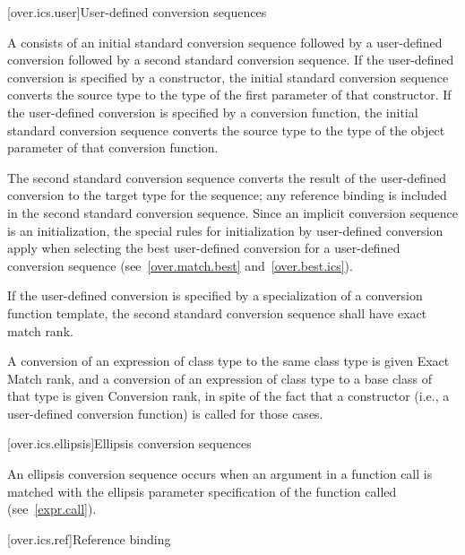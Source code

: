 [over.ics.user]{User-defined conversion sequences}

\pnum
A  consists of an initial
standard conversion sequence followed by a user-defined
conversion followed by a second standard
conversion sequence.
If the user-defined conversion is specified
by a constructor, the initial standard
conversion sequence converts the source type to the type of the
first parameter of that constructor.
If the user-defined
conversion is specified by a conversion function, the
initial standard conversion sequence
converts the source type to the type of the
object parameter of that conversion function.

\pnum
The second standard conversion sequence converts the result of
the user-defined conversion to the target type for the sequence;
any reference binding is included in the second standard
conversion sequence.
Since an implicit conversion sequence is an initialization, the
special rules for initialization by user-defined conversion apply
when selecting the best user-defined conversion for a
user-defined conversion sequence (see~\ref{over.match.best} and~\ref{over.best.ics}).

\pnum
If the user-defined conversion is specified by a
specialization of a conversion function template,
the second standard conversion sequence shall have exact match rank.

\pnum
A conversion of an expression of class type
to the same class type is given Exact Match rank, and
a conversion of an expression of class type
to a base class of that type is given Conversion rank,
in spite of the
fact that a constructor (i.e., a user-defined conversion
function) is called for those cases.

[over.ics.ellipsis]{Ellipsis conversion sequences}

\pnum
{}%
An ellipsis conversion sequence occurs when an argument in a
function call is matched with the ellipsis parameter
specification of the function called (see~\ref{expr.call}).

[over.ics.ref]{Reference binding}

